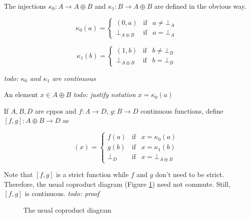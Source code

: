 \documentclass[a4paper]{article}
\newcommand{\arr}{\rightarrow}
\newcommand{\todo}[1]{\smallskip \noindent \emph{todo: #1} \smallskip}
\begin{document}
The injections $\kappa_0 : A \arr A \oplus B$ and $\kappa_1 : B \arr A \oplus B$
are defined in the obvious way.

\begin{equation*}
\kappa_0(a) = \left\{
  \begin{array}{rcl}
   (0,a)             & \text{if} & a \not= \bot_A \\
   \bot_{A \oplus B} & \text{if} & a = \bot_A
  \end{array}
\right.
\end{equation*}

\begin{equation*}
\kappa_1(b) = \left\{
  \begin{array}{rcl}
   (1,b)             & \text{if} & b \not= \bot_B \\
   \bot_{A \oplus B} & \text{if} & b = \bot_B
  \end{array}
\right.
\end{equation*}

\todo{$\kappa_0$ and $\kappa_1$ are continuous}

An element $x \in A \oplus B$ \todo{justify notation $x = \kappa_0(a)$}

If $A, B, D$ are cppos and $f : A \arr D$, $g : B \arr D$ continuous functions,
define $[f,g] : A \oplus B \arr D$ as

\begin{equation*}
[f,g](x) = \left\{
  \begin{array}{rcl}
   f(a)     & \text{if} & x = \kappa_0(a) \\
   g(b)     & \text{if} & x = \kappa_1(b) \\
   \bot_{D} & \text{if} & x = \bot_{A \oplus B}
  \end{array}
\right.
\end{equation*}

Note that $[f,g]$ is a strict function while $f$ and $g$ don't need to be
strict.  Therefore, the usual coproduct diagram (Figure
\ref{figCoproductDiagram}) need not commute. Still, $[f,g]$
is continuous. \todo{proof}

\begin{figure}[ht]
\begin{center}
\end{center}
\caption{The usual coproduct diagram} \label{figCoproductDiagram}
\end{figure}
\end{document}
